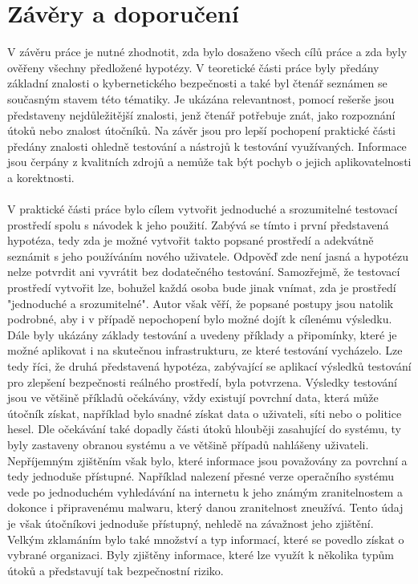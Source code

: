
\section{Závěry a doporučení}\label{sec:zavery-a-doporuceni}
V závěru práce je nutné zhodnotit, zda bylo dosaženo všech cílů práce a zda byly ověřeny všechny předložené hypotézy.
V teoretické části práce byly předány základní znalosti o kybernetického bezpečnosti a také byl čtenář seznámen se současným stavem této tématiky.
Je ukázána relevantnost, pomocí rešerše jsou představeny nejdůležitější znalosti, jenž čtenář potřebuje znát, jako rozpoznání útoků nebo znalost útočníků.
Na závěr jsou pro lepší pochopení praktické části předány znalosti ohledně testování a nástrojů k testování využívaných.
Informace jsou čerpány z kvalitních zdrojů a nemůže tak být pochyb o jejich aplikovatelnosti a korektnosti.

\paragraph{}
V praktické části práce bylo cílem vytvořit jednoduché a srozumitelné testovací prostředí spolu s návodek k jeho použití.
Zabývá se tímto i první představená hypotéza, tedy zda je možné vytvořit takto popsané prostředí a adekvátně seznámit s jeho používáním nového uživatele.
Odpověď zde není jasná a hypotézu nelze potvrdit ani vyvrátit bez dodatečného testování.
Samozřejmě, že testovací prostředí vytvořit lze, bohužel každá osoba bude jinak vnímat, zda je prostředí "jednoduché a srozumitelné".
Autor však věří, že popsané postupy jsou natolik podrobné, aby i v případě nepochopení bylo možné dojít k cílenému výsledku.
Dále byly ukázány základy testování a uvedeny příklady a připomínky, které je možné aplikovat i na skutečnou infrastrukturu, ze které testování vycházelo.
Lze tedy říci, že druhá představená hypotéza, zabývající se aplikací výsledků testování pro zlepšení bezpečnosti reálného prostředí, byla potvrzena.
Výsledky testování jsou ve většině příkladů očekávány, vždy existují povrchní data, která může útočník získat, například bylo snadné získat data o uživateli, síti nebo o politice hesel.
Dle očekávání také dopadly části útoků hlouběji zasahující do systému, ty byly zastaveny obranou systému a ve většině případů nahlášeny uživateli.
Nepříjemným zjištěním však bylo, které informace jsou považovány za povrchní a tedy jednoduše přístupné.
Například nalezení přesné verze operačního systému vede po jednoduchém vyhledávání na internetu k jeho známým zranitelnostem a dokonce i připravenému malwaru, který danou zranitelnost zneužívá.
Tento údaj je však útočníkovi jednoduše přístupný, nehledě na závažnost jeho zjištění.
Velkým zklamáním bylo také množství a typ informací, které se povedlo získat o vybrané organizaci.
Byly zjištěny informace, které lze využít k několika typům útoků a představují tak bezpečnostní riziko.

